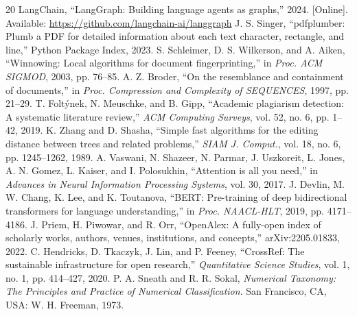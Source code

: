 \documentclass[conference]{IEEEtran}
\begin{document}
\begin{thebibliography}{20}
LangChain, ``LangGraph: Building language agents as graphs,'' 2024. [Online]. Available: \url{https://github.com/langchain-ai/langgraph}
J. S. Singer, ``pdfplumber: Plumb a PDF for detailed information about each text character, rectangle, and line,'' Python Package Index, 2023.
S. Schleimer, D. S. Wilkerson, and A. Aiken, ``Winnowing: Local algorithms for document fingerprinting,'' in \textit{Proc. ACM SIGMOD}, 2003, pp. 76--85.
A. Z. Broder, ``On the resemblance and containment of documents,'' in \textit{Proc. Compression and Complexity of SEQUENCES}, 1997, pp. 21--29.
T. Folt\'ynek, N. Meuschke, and B. Gipp, ``Academic plagiarism detection: A systematic literature review,'' \textit{ACM Computing Surveys}, vol. 52, no. 6, pp. 1--42, 2019.
K. Zhang and D. Shasha, ``Simple fast algorithms for the editing distance between trees and related problems,'' \textit{SIAM J. Comput.}, vol. 18, no. 6, pp. 1245--1262, 1989.
A. Vaswani, N. Shazeer, N. Parmar, J. Uszkoreit, L. Jones, A. N. Gomez, L. Kaiser, and I. Polosukhin, ``Attention is all you need,'' in \textit{Advances in Neural Information Processing Systems}, vol. 30, 2017.
J. Devlin, M. W. Chang, K. Lee, and K. Toutanova, ``BERT: Pre-training of deep bidirectional transformers for language understanding,'' in \textit{Proc. NAACL-HLT}, 2019, pp. 4171--4186.
J. Priem, H. Piwowar, and R. Orr, ``OpenAlex: A fully-open index of scholarly works, authors, venues, institutions, and concepts,'' arXiv:2205.01833, 2022.
C. Hendricks, D. Tkaczyk, J. Lin, and P. Feeney, ``CrossRef: The sustainable infrastructure for open research,'' \textit{Quantitative Science Studies}, vol. 1, no. 1, pp. 414--427, 2020.
P. A. Sneath and R. R. Sokal, \textit{Numerical Taxonomy: The Principles and Practice of Numerical Classification}. San Francisco, CA, USA: W. H. Freeman, 1973.
\end{thebibliography}
\end{document}
